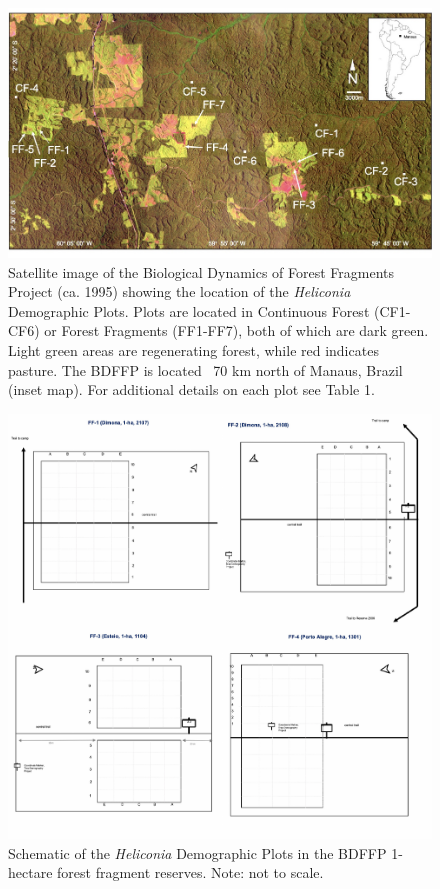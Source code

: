 \documentclass[
  12pt,
  man, donotrepeattitle,floatsintext]{apa6}
\begin{document}
\endgroup

\begin{figure}[h]
\includegraphics[width=1\linewidth]{Bruna_etal_MetadataS1_files/figure-latex/map-1} \caption{Satellite image of the Biological Dynamics of Forest Fragments Project (ca. 1995) showing the location of the \textit{Heliconia} Demographic Plots. Plots are located in Continuous Forest (CF1-CF6) or Forest Fragments (FF1-FF7), both of which are dark green. Light green areas are regenerating forest, while red indicates pasture. The BDFFP is located ~70 km north of Manaus, Brazil (inset map). For additional details on each plot see Table 1.}\label{fig:map}
\end{figure}

\newpage

\begin{figure}[h]

{\centering \includegraphics{Bruna_etal_MetadataS1_files/figure-latex/plotsone-1} 

}

\caption{Schematic of the \textit{Heliconia} Demographic Plots in the BDFFP 1-hectare forest fragment reserves. Note: not to scale.}\label{fig:plotsone}
\end{figure}
\end{document}
